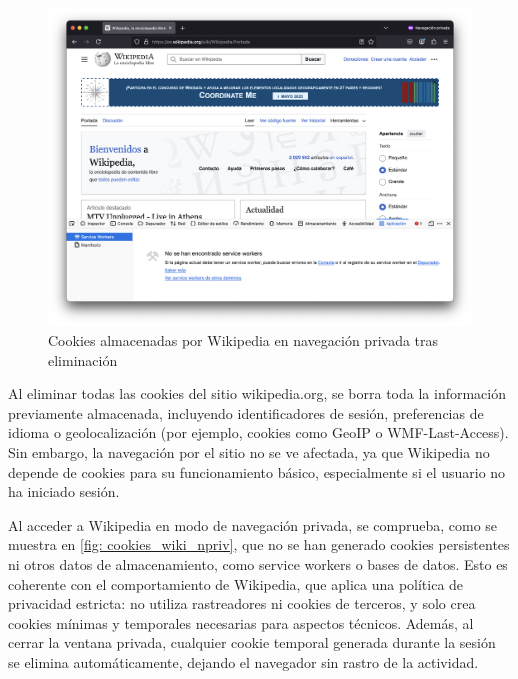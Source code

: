 \begin{figure}[H]   
    \includegraphics[width=15cm]{cookies_wiki_npriv.png}
    \caption{Cookies almacenadas por Wikipedia en navegación privada tras eliminación}
    \label{fig:cookies_wiki_npriv}
\end{figure}

Al eliminar todas las cookies del sitio wikipedia.org, se borra toda la información previamente almacenada, incluyendo identificadores de sesión, preferencias de idioma o geolocalización (por ejemplo, cookies como GeoIP o WMF-Last-Access). Sin embargo, la navegación por el sitio no se ve afectada, ya que Wikipedia no depende de cookies para su funcionamiento básico, especialmente si el usuario no ha iniciado sesión. 

Al acceder a Wikipedia en modo de navegación privada, se comprueba, como se muestra en \ref{fig: cookies_wiki_npriv}, que no se han generado cookies persistentes ni otros datos de almacenamiento, como service workers o bases de datos. Esto es coherente con el comportamiento de Wikipedia, que aplica una política de privacidad estricta: no utiliza rastreadores ni cookies de terceros, y solo crea cookies mínimas y temporales necesarias para aspectos técnicos. Además, al cerrar la ventana privada, cualquier cookie temporal generada durante la sesión se elimina automáticamente, dejando el navegador sin rastro de la actividad. 

